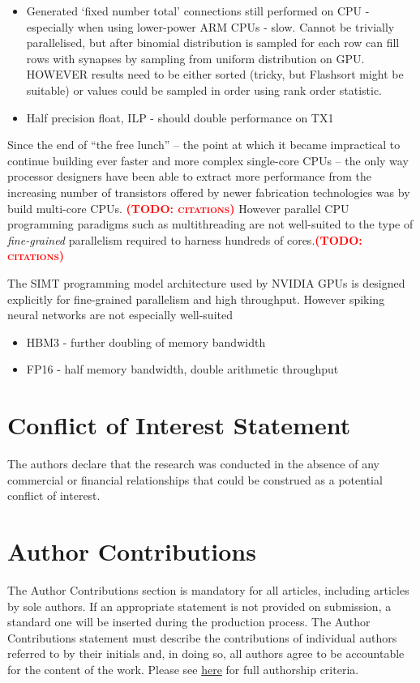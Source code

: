 \documentclass[utf8]{frontiersSCNS} %
\newcommand{\todo}[1]{\textbf{\textsc{\textcolor{red}{(TODO: #1)}}}}
\begin{document}
\begin{itemize}
    \item Generated `fixed number total' connections still performed on CPU - especially when using lower-power ARM CPUs - slow. Cannot be trivially parallelised, but after binomial distribution is sampled for each row can fill rows with synapses by sampling from uniform distribution on GPU. HOWEVER results need to be either sorted (tricky, but Flashsort might be suitable) or values could be sampled in order using rank order statistic.
    \item Half precision float, ILP - should double performance on TX1
\end{itemize}
Since the end of ``the free lunch'' -- the point at which it became impractical to continue building ever faster and more complex single-core CPUs -- the only way processor designers have been able to extract more performance from the increasing number of transistors offered by newer fabrication technologies was by build multi-core CPUs. \todo{citations}
However parallel CPU programming paradigms such as multithreading are not well-suited to the type of \textit{fine-grained} parallelism required to harness hundreds of cores.\todo{citations}

The SIMT programming model architecture used by NVIDIA GPUs is designed explicitly for fine-grained parallelism and high throughput.
However spiking neural networks are not especially well-suited

\begin{itemize}
    \item HBM3 - further doubling of memory bandwidth
    \item FP16 - half memory bandwidth, double arithmetic throughput
\end{itemize}

\section*{Conflict of Interest Statement}
The authors declare that the research was conducted in the absence of any commercial or financial relationships that could be construed as a potential conflict of interest.

\section*{Author Contributions}
The Author Contributions section is mandatory for all articles, including articles by sole authors. If an appropriate statement is not provided on submission, a standard one will be inserted during the production process. The Author Contributions statement must describe the contributions of individual authors referred to by their initials and, in doing so, all authors agree to be accountable for the content of the work. Please see  \href{http://home.frontiersin.org/about/author-guidelines#AuthorandContributors}{here} for full authorship criteria.
\end{document}
